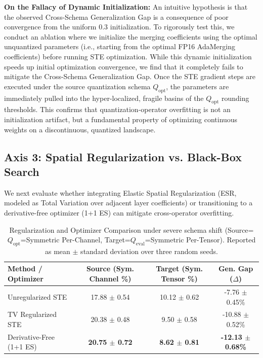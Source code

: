 \textbf{On the Fallacy of Dynamic Initialization:} An intuitive hypothesis is that the observed Cross-Schema Generalization Gap is a consequence of poor convergence from the uniform $0.3$ initialization. To rigorously test this, we conduct an ablation where we initialize the merging coefficients using the optimal unquantized parameters (i.e., starting from the optimal FP16 AdaMerging coefficients) before running STE optimization. While this dynamic initialization speeds up initial optimization convergence, we find that it completely fails to mitigate the Cross-Schema Generalization Gap. Once the STE gradient steps are executed under the source quantization schema $Q_{\text{opt}}$, the parameters are immediately pulled into the hyper-localized, fragile basins of the $Q_{\text{opt}}$ rounding thresholds. This confirms that quantization-operator overfitting is not an initialization artifact, but a fundamental property of optimizing continuous weights on a discontinuous, quantized landscape.

\subsection{Axis 3: Spatial Regularization vs. Black-Box Search}
We next evaluate whether integrating Elastic Spatial Regularization (ESR, modeled as Total Variation over adjacent layer coefficients) or transitioning to a derivative-free optimizer (1+1 ES) can mitigate cross-operator overfitting.

\begin{table}[t]
\caption{Regularization and Optimizer Comparison under severe schema shift (Source=$Q_{\text{opt}}$=Symmetric Per-Channel, Target=$Q_{\text{eval}}$=Symmetric Per-Tensor). Reported as mean $\pm$ standard deviation over three random seeds.}
\label{tab:axis3_reg}
\vskip 0.15in
\begin{center}
\begin{small}
\begin{sc}
\begin{tabular}{lccc}
\toprule
Method / Optimizer & Source (Sym. Channel \%) & Target (Sym. Tensor \%) & \textbf{Gen. Gap ($\Delta$)} \\
\midrule
Unregularized STE & 17.88 $\pm$ 0.54 & 10.12 $\pm$ 0.62 & -7.76 $\pm$ 0.45\% \\
TV Regularized STE & 20.38 $\pm$ 0.48 & 9.50 $\pm$ 0.58 & -10.88 $\pm$ 0.52\% \\
Derivative-Free (1+1 ES) & \textbf{20.75 $\pm$ 0.72} & \textbf{8.62 $\pm$ 0.81} & \textbf{-12.13 $\pm$ 0.68\%} \\
\bottomrule
\end{tabular}
\end{sc}
\end{small}
\end{center}
\vskip -0.1in
\end{table}

